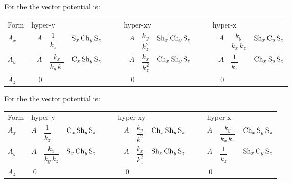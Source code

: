 For the   the vector potential is:
\begin{center}
{
\setlength{\tabcolsep}{1pt}
\begin{tabular}{lrllrllrll}
  Form \; & \multicolumn{3}{l}{hyper-y}  & \multicolumn{3}{l}{hyper-xy}  & \multicolumn{3}{l}{hyper-x} \\
  $A_x$   & 
     $A$ & $\dfrac{1}{k_z}$          & $\text{S}_x \, \text{Ch}_y \, \text{S}_z \qquad$ &
     $A$ & $\dfrac{k_y}{k_z^2}$      & $\text{Sh}_x \, \text{Ch}_y \, \text{S}_z \qquad$ &
     $A$ & $\dfrac{k_y}{k_x \, k_z}$ & $\text{Sh}_x \, \text{C}_y \, \text{S}_z$ \\
  $A_y$   & 
    $-A$ & $\dfrac{k_x}{k_y \, k_z}$ & $\text{C}_x \, \text{Sh}_y \, \text{S}_z \qquad$ &
    $-A$ & $\dfrac{k_x}{k_z^2}$      & $\text{Ch}_x \, \text{Sh}_y \, \text{S}_z \qquad$ &
    $-A$ & $\dfrac{1}{k_z}$          & $\text{Ch}_x \, \text{S}_y \, \text{S}_z$ \\
  $A_z$   & 0 &&& 0 &&& 0 &&
\end{tabular}
}
\end{center}

For the   the vector potential is:
\begin{center}
{
\setlength{\tabcolsep}{1pt}
\begin{tabular}{lrllrllrll}
  Form \; & \multicolumn{3}{l}{hyper-y}  & \multicolumn{3}{l}{hyper-xy}  & \multicolumn{3}{l}{hyper-x} \\
  $A_x$   & 
     $A$ & $\dfrac{1}{k_z}$          & $\text{C}_x \, \text{Sh}_y \, \text{S}_z \qquad$ &
     $A$ & $\dfrac{k_y}{k_z^2}$      & $\text{Ch}_x \, \text{Sh}_y \, \text{S}_z \qquad$ &
     $A$ & $\dfrac{k_y}{k_x \, k_z}$ & $\text{Ch}_x \, \text{S}_y \, \text{S}_z$ \\
  $A_y$   & 
     $A$ & $\dfrac{k_x}{k_y \, k_z}$ & $\text{S}_x \, \text{Ch}_y \, \text{S}_z \qquad$ &
    $-A$ & $\dfrac{k_x}{k_z^2}$      & $\text{Sh}_x \, \text{Ch}_y \, \text{S}_z \qquad$ &
     $A$ & $\dfrac{1}{k_z}$          & $\text{Sh}_x \, \text{C}_y \, \text{S}_z$ \\
  $A_z$   & 0 &&& 0 &&& 0 &&
\end{tabular}
}
\end{center}

